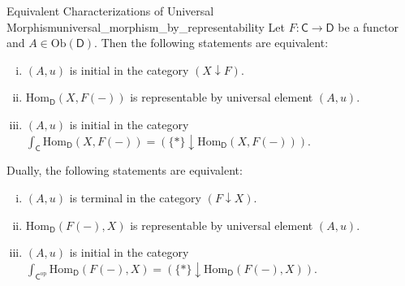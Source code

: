 \begin{proposition}{Equivalent Characterizations of Universal Morphism}{universal_morphism_by_representability}
    Let $F:\mathsf{C}\to \mathsf{D}$ be a functor and $A\in \mathrm{Ob}(\mathsf{D})$. Then the following statements are equivalent:
    \begin{enumerate}[(i)]
        \item $(A,u)$ is initial in the category $\left(X \downarrow F\right)$.
        \item $\mathrm{Hom}_{\mathsf{D}}\left(X,F(-)\right)$ is representable by universal element $(A,u)$.
        \item $(A,u)$ is initial in the category $\int_{\mathsf{C}}  \mathrm{Hom}_{\mathsf{D}}\left(X,F(-)\right)=\left( \{*\}\downarrow \mathrm{Hom}_{\mathsf{D}}\left(X,F(-)\right)\right)$.
    \end{enumerate}
 Dually, the following statements are equivalent:
    \begin{enumerate}[(i)]
        \item $(A,u)$ is terminal in the category $\left(F \downarrow X\right)$.
        \item $\mathrm{Hom}_{\mathsf{D}}\left(F(-),X\right)$ is representable by universal element $(A,u)$.
        \item $(A,u)$ is initial in the category $\int_{\mathsf{C}^{\mathrm{op}}}  \mathrm{Hom}_{\mathsf{D}}\left(F(-),X\right)=\left( \{*\}\downarrow \mathrm{Hom}_{\mathsf{D}}\left(F(-),X\right)\right)$.
    \end{enumerate}
\end{proposition}

